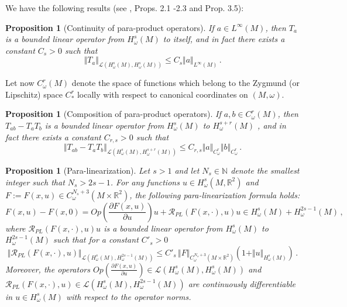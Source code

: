 \documentclass[11pt]{amsart}
\newcommand \R {{ \mathbb R}}
\newcommand \N {{ \mathbb N}}
\newtheorem {proposition}[theorem]{Proposition}
\begin{document}
\smallskip
We have the following results (see \cite{AlSh}, Props. 2.1 -2.3 and Prop. 3.5):

\begin{proposition} [Continuity of para-product operators]  \label{prop:para-cont}  If  $a\in L^\infty(M)$,  then $T_a$ is a bounded linear
operator from $H^s_\omega(M)$ to itself, and in fact there exists a constant $C_s>0$ such that
$$
\Vert T_a \Vert_{\mathcal L( H^s_\omega(M), H^s_\omega(M)) } \leq C_s \Vert a \Vert_{L^\infty(M)}\,.
$$
\end{proposition}

Let now $C^r_\omega(M)$ denote the space of functions which belong to the Zygmund (or Lipschitz) space $C^r_\ast$ locally with respect to
canonical coordinates on $(M, \omega)$. 

\begin{proposition} [Composition of para-product operators]   \label{prop:para-comp}  If  $a, b\in C^r_\omega (M)$,  then $T_{ab} -T_a T_b$ is a bounded linear
operator from $H^s_\omega(M)$ to $H^{s+r}_\omega(M)$ , and in fact there exists a constant $C_{r,s}>0$ such that
$$
\Vert T_{ab} -T_a T_b \Vert_{\mathcal L( H^s_\omega(M), H^{s+r}_\omega(M)) } \leq C_{r,s}  \Vert a \Vert_{C^r_\omega} \Vert b \Vert_{C^r_\omega}\,.
$$
\end{proposition}

\begin{proposition}[Para-linearization]   \label{prop:para-lin}    Let $s>1$ and   let $N_s\in \N$
denote the smallest integer such that $N_s > 2s-1$. For any functions $u \in  H^s_\omega(M, \R^2)$ and
$F := F(x,u) \in  C^{N_s+3}_\omega(M \times \R^2 )$, the following para-linearization formula holds:
$$
F(x,u)-F(x,0)= Op({ \frac{\partial F(x,u)}{ \partial u}} ) u + \mathcal R_{PL} (F(x,·),u)u  \in H^s_\omega(M) +H^{2s-1} _\omega(M)\,, 
$$
where $\mathcal R_{PL} (F(x, \cdot),u)u$ is a bounded linear operator from $H^s_\omega(M)$ to $H^{2s-1}_\omega(M)$  such that for a constant $C'_s >0$
$$
\Vert \mathcal R_{PL} (F(x,\cdot),u) \Vert_{\mathcal L(H^{s}_\omega(M), H^{2s-1}_\omega(M) )}  \leq  C'_s  \, \Vert F \Vert_{C^{N_s+3}_\omega(M \times \R^2 )} (1+\Vert u \Vert_{ H^s_\omega(M)})  \,. 
$$
Moreover, the operators $Op({ \frac{\partial F(x,u)}{ \partial u}} ) \in  \mathcal L(H^{s}_\omega(M), H^{s}_\omega(M))$ and   $\mathcal R_{PL} (F(x,\cdot),u) \in  \mathcal L(H^{s}_\omega(M), H^{2s-1}_\omega(M))$  are continuously differentiable in $u\in H^s_\omega(M)$ with respect to the operator norms.
\end{proposition}
\end{document}
